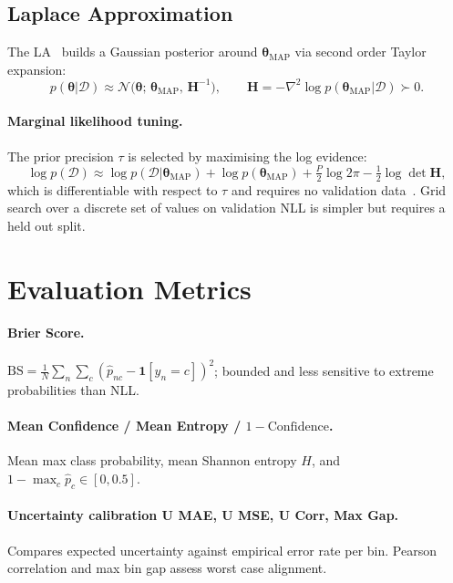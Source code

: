\documentclass[12pt,a4paper]{article}
\newcommand{\btheta}{\bm{\theta}}
\newcommand{\cD}{\mathcal{D}}
\newcommand{\cN}{\mathcal{N}}
\newcommand{\MAP}{\text{MAP}}
\begin{document}
\subsection{Laplace Approximation}
\label{sec:theory:la}

The LA~\citep{daxberger2021laplace} builds a Gaussian posterior around
$\btheta_{\MAP}$ via second order Taylor expansion:
\begin{equation}
  p(\btheta|\cD) \approx \cN\!\bigl(\btheta;\,\btheta_{\MAP},\,\mathbf{H}^{-1}\bigr),
  \qquad
  \mathbf{H} = -\nabla^2\log p(\btheta_{\MAP}|\cD) \succ 0.
\end{equation}

\paragraph{Marginal likelihood tuning.}
The prior precision $\tau$ is selected by maximising the log evidence:
\begin{equation}
  \log p(\cD)
    \approx \log p(\cD|\btheta_{\MAP})
    + \log p(\btheta_{\MAP})
    + \tfrac{P}{2}\log 2\pi
    - \tfrac{1}{2}\log\det\mathbf{H},
  \label{eq:marglik}
\end{equation}
which is differentiable with respect to $\tau$ and requires no validation
data~\citep{daxberger2021laplace}. Grid search over
a discrete set of values on validation NLL is simpler but requires a
held out split.

\section{Evaluation Metrics}
\label{sec:metrics}

\paragraph{Brier Score.}
$\mathrm{BS}=\frac{1}{N}\sum_n\sum_c(\hat{p}_{nc}-\mathbf{1}[y_n=c])^2$;
bounded and less sensitive to extreme probabilities than NLL.

\paragraph{Mean Confidence / Mean Entropy / $1 - \text{Confidence}$.}
Mean max class probability, mean Shannon entropy $H$, and
$1-\max_c\hat{p}_c\in[0,0.5]$.

\paragraph{Uncertainty calibration U MAE, U MSE, U Corr, Max Gap.}
Compares expected uncertainty against empirical error rate
per bin. Pearson correlation and max bin gap assess worst case alignment.
\end{document}
